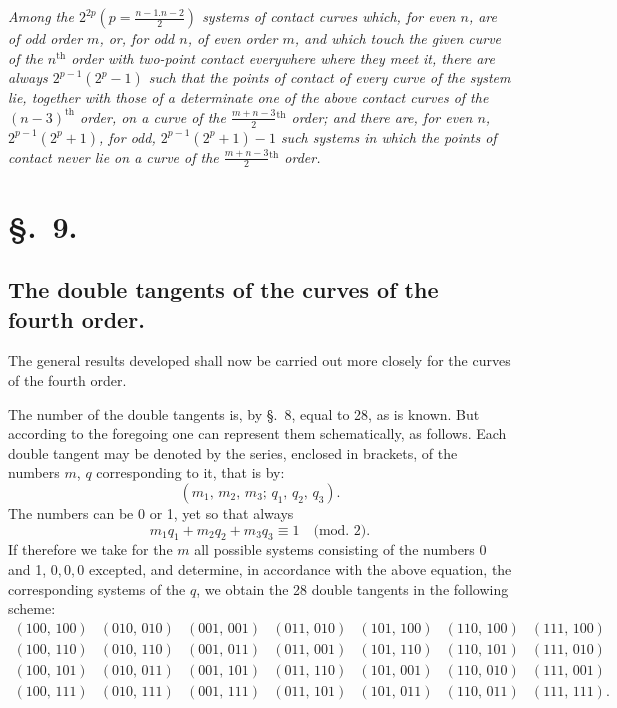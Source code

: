 \documentclass{article}
\begin{document}
\emph{Among the $2^{2p}\left(p = \frac{n-1.n-2}{2}\right)$ systems of contact curves which, for even $n$, are of odd order $m$, or, for odd $n$, of even order $m$, and which touch the given curve of the $n^{\text{th}}$ order with two-point contact everywhere where they meet it, there are always $2^{p-1}(2^{p}-1)$ such that the points of contact of every curve of the system lie, together with those of a determinate one of the above contact curves of the $(n-3)^{\text{th}}$ order, on a curve of the $\frac{m+n-3}{2}{}^{\text{th}}$ order; and there are, for even $n$, $2^{p-1}(2^{p}+1)$, for odd, $2^{p-1}(2^{p}+1)-1$ such systems in which the points of contact never lie on a curve of the $\frac{m+n-3}{2}{}^{\text{th}}$ order.}

\section*{§.~9.}

\subsection*{The double tangents of the curves of the fourth order.}

The general results developed shall now be carried out more closely for the curves of the fourth order.

The number of the double tangents is, by §.~8, equal to 28, as is known. But according to the foregoing one can represent them schematically, as follows. Each double tangent may be denoted by the series, enclosed in brackets, of the numbers $m$, $q$ corresponding to it, that is by:
\[
(m_{1},\, m_{2},\, m_{3};\, q_{1},\, q_{2},\, q_{3}).
\]
The numbers can be 0 or 1, yet so that always
\[
m_{1}q_{1}+m_{2}q_{2}+m_{3}q_{3} \equiv 1 \quad \text{(mod.\ 2)}.
\]
If therefore we take for the $m$ all possible systems consisting of the numbers 0 and 1, $0,0,0$ excepted, and determine, in accordance with the above equation, the corresponding systems of the $q$, we obtain the 28 double tangents in the following scheme:
\[
\begin{array}{ccccccc}
(100,\,100) & (010,\,010) & (001,\,001) & (011,\,010) & (101,\,100) & (110,\,100) & (111,\,100)\\
(100,\,110) & (010,\,110) & (001,\,011) & (011,\,001) & (101,\,110) & (110,\,101) & (111,\,010)\\
(100,\,101) & (010,\,011) & (001,\,101) & (011,\,110) & (101,\,001) & (110,\,010) & (111,\,001)\\
(100,\,111) & (010,\,111) & (001,\,111) & (011,\,101) & (101,\,011) & (110,\,011) & (111,\,111).
\end{array}
\]
\end{document}
